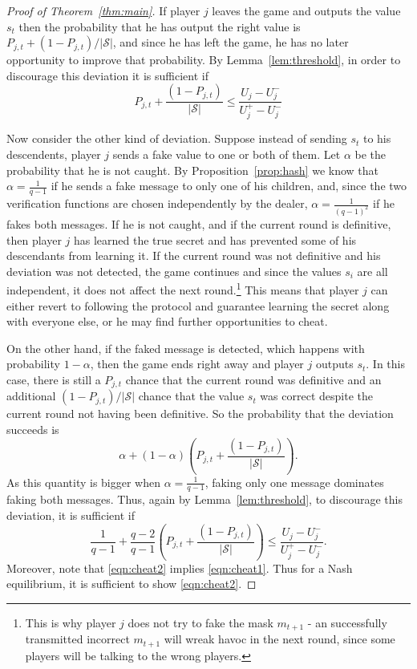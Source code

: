 \documentclass[12pt]{article}
\theoremstyle{definition}
\newcommand{\Uplus}{U^{+}}
\newcommand{\Uminus}{U^{-}}
\renewcommand{\S}{\mathcal{S}}
\newcommand{\Pjt}{P_{j,t}}
\begin{document}
\begin{proof}[Proof of Theorem~\ref{thm:main}]
If player $j$ leaves the game and outputs the value $s_t$ then the probability 
that he has output the right value is $\Pjt + (1-\Pjt)/|\S|$, and since he 
has left the game, he has no later opportunity to improve that probability.
By Lemma~\ref{lem:threshold}, in order to discourage this deviation it is 
sufficient if 
\begin{equation}\label{eqn:cheat1}
\Pjt + \frac{(1-\Pjt)}{|\S|} \le \frac{U_j-\Uminus_j}{\Uplus_j-\Uminus_j} 
\end{equation}

Now consider the other kind of deviation. Suppose instead of sending $s_{t}$ to 
his descendents, player $j$ sends a fake value to one or both of them. Let 
$\alpha$ be the probability that he is not caught. By 
Proposition~\ref{prop:hash} we know that $\alpha=\frac{1}{q-1}$ if he sends 
a fake message to only one of his children, and, since the two verification 
functions are chosen independently by the dealer, $\alpha = \frac{1}{(q-1)^2}$
if he fakes both messages.
If he is not caught, and if the current round is definitive, then
player $j$ has learned the true secret and has prevented some of his descendants from 
learning it.   If the current round was not definitive and his deviation 
was not detected, the game continues and since the values $s_i$ are all 
independent, it does not affect the next round.\footnote{This is why player $j$ does 
not try to fake the mask $m_{t+1}$ - an successfully transmitted incorrect 
$m_{t+1}$ will wreak havoc in the next round, since some players will be 
talking to the wrong players.} This means that player $j$ can either revert to 
following the protocol and guarantee learning the secret along with everyone 
else, or he may find further opportunities to cheat.

On the other hand, if the faked message is detected, which happens with probability 
$1-\alpha$, then the game ends right away and player $j$ 
outputs $s_t$. In this case, there is still a $\Pjt$ chance that the current 
round was definitive and an additional $(1-\Pjt)/|\S|$ chance that the 
value $s_t$ was correct despite the current round not having been definitive.
So the probability that the deviation succeeds is 
\[
\alpha + (1-\alpha)\left(\Pjt + \frac{(1-\Pjt)}{|\S|}\right).
\]
As this quantity is bigger when $\alpha= \frac{1}{q-1}$, faking only one 
message dominates faking both messages.
Thus, again by Lemma~\ref{lem:threshold}, to discourage this deviation, it is 
sufficient if
\begin{equation}\label{eqn:cheat2}
\frac{1}{q-1}+ \frac{q-2}{q-1}\left(\Pjt + \frac{(1-\Pjt)}{|\S|}\right)
\le \frac{U_j-\Uminus_j}{\Uplus_j-\Uminus_j}.
\end{equation}
Moreover, note that \eqref{eqn:cheat2} implies \eqref{eqn:cheat1}.
Thus for a Nash equilibrium, it is sufficient to show \eqref{eqn:cheat2}.


\end{proof}
\end{document}
